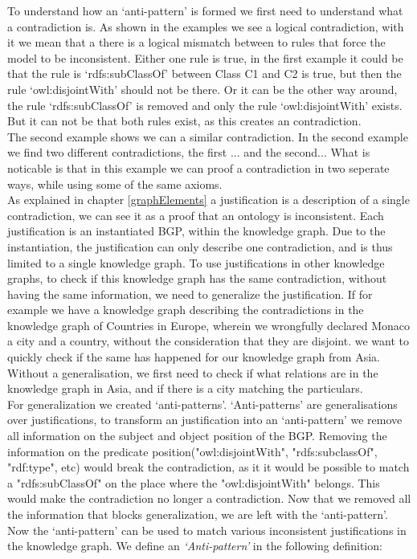 \documentclass[11pt,letterpaper ,oneside ]{book}
\begin{document}
To understand how an `anti-pattern' is formed we first need to understand what a contradiction is. As shown in the examples we see a logical contradiction, with it we mean that a there is a logical mismatch between to rules that force the model to be inconsistent. Either one rule is true, in the first example it could be that the rule is `rdfs:subClassOf' between Class C1 and C2 is true, but then the rule `owl:disjointWith' should not be there. Or it can be the other way around, the rule `rdfs:subClassOf' is removed and only the rule `owl:disjointWith' exists. But it can not be that both rules exist, as this creates an contradiction. \\

The second example shows we can a similar contradiction. In the second example we find two different contradictions, the first ... and the second... What is noticable is that in this example we can proof a contradiction in two seperate ways, while using some of the same axioms. \\

As explained in chapter \ref{graphElements} a justification is a description of a single contradiction, we can see it as a proof that an ontology is inconsistent. Each justification is an instantiated BGP, within the knowledge graph. Due to the instantiation, the justification can only describe one contradiction, and is thus limited to a single knowledge graph. To use justifications in other knowledge graphs, to check if this knowledge graph has the same contradiction, without having the same information, we need to generalize the justification. If for example we have a knowledge graph describing the contradictions in the knowledge graph of Countries in Europe, wherein we wrongfully declared Monaco a city and a country, without the consideration that they are disjoint. we want to quickly check if the same has happened for our knowledge graph from Asia. Without a generalisation, we first need to check if what relations are in the knowledge graph in Asia, and if there is a city matching the particulars.\\

For generalization we created `anti-patterns'. `Anti-patterns' are generalisations over justifications, to transform an justification into an `anti-pattern' we remove all information on the subject and object position of the BGP. Removing the information on the predicate position("owl:disjointWith", "rdfs:subclassOf", "rdf:type", etc) would break the contradiction, as it it would be possible to match a "rdfs:subClassOf" on the place where the "owl:disjointWith" belongs. This would make the contradiction no longer a contradiction.  
Now that we removed all the information that blocks generalization, we are left with the `anti-pattern'. Now the `anti-pattern' can be used to match various inconsistent justifications in the knowledge graph. We define an \textit{`Anti-pattern'} in the following definition:\\
\end{document}
